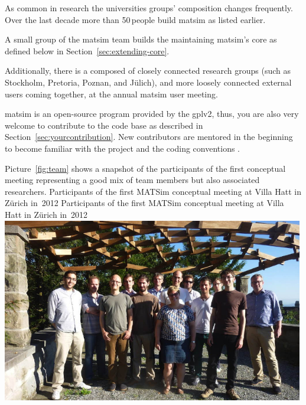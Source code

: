 As common in research the universities groups' composition changes frequently. Over the last decade more than 50\,people build \gls{matsim} as listed earlier.

A small group of the \gls{matsim} team builds the  maintaining \gls{matsim}'s core as defined below in Section~\ref{sec:extending-core}.

Additionally, there is a  composed of closely connected research groups (such as Stockholm, Pretoria, Poznan, and Jülich),
and more loosely connected external users coming together, \eg at the annual \gls{matsim} user meeting.   

\gls{matsim} is an open-source program provided by the \gls{gplv2}, thus, you are also very welcome to contribute to the code base as described in Section~\ref{sec:yourcontribution}. New contributors are mentored in the beginning \citep[][]{MATSIM-BecomingAContributor_Webpage_2015} to become familiar with the project and the coding conventions \citep[][]{MATSIM-CodingGuide_Webpage_2015}.

Picture~\ref{fig:team} shows a snapshot of the participants of the first conceptual meeting representing a good mix of team members but also associated researchers.
%
\createfigure%
{Participants of the first MATSim conceptual meeting at Villa Hatt in Zürich in~2012}%
{Participants of the first MATSim conceptual meeting at Villa Hatt in Zürich in~2012}%
{\label{fig:team}}%
{\includegraphics[width=0.99\textwidth, angle=0]{extending/figures/ConceptualMeetingVillaHatt.png}}%
{}

